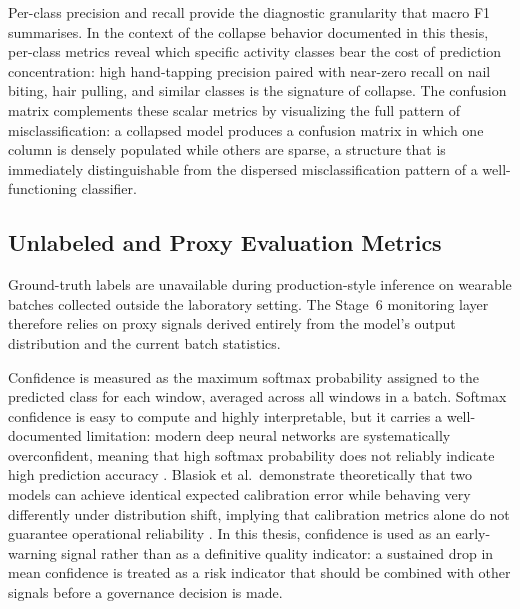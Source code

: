 Per-class precision and recall provide the diagnostic granularity that macro F1 summarises. In the context of the collapse behavior documented in this thesis, per-class metrics reveal which specific activity classes bear the cost of prediction concentration: high hand-tapping precision paired with near-zero recall on nail biting, hair pulling, and similar classes is the signature of collapse. The confusion matrix complements these scalar metrics by visualizing the full pattern of misclassification: a collapsed model produces a confusion matrix in which one column is densely populated while others are sparse, a structure that is immediately distinguishable from the dispersed misclassification pattern of a well-functioning classifier.

\subsection{Unlabeled and Proxy Evaluation Metrics}

Ground-truth labels are unavailable during production-style inference on wearable batches collected outside the laboratory setting. The Stage~6 monitoring layer therefore relies on proxy signals derived entirely from the model's output distribution and the current batch statistics.

Confidence is measured as the maximum softmax probability assigned to the predicted class for each window, averaged across all windows in a batch. Softmax confidence is easy to compute and highly interpretable, but it carries a well-documented limitation: modern deep neural networks are systematically overconfident, meaning that high softmax probability does not reliably indicate high prediction accuracy \cite{guo2017calibration}. Blasiok et al.\ demonstrate theoretically that two models can achieve identical expected calibration error while behaving very differently under distribution shift, implying that calibration metrics alone do not guarantee operational reliability \cite{blasiok2024calibration}. In this thesis, confidence is used as an early-warning signal rather than as a definitive quality indicator: a sustained drop in mean confidence is treated as a risk indicator that should be combined with other signals before a governance decision is made.

